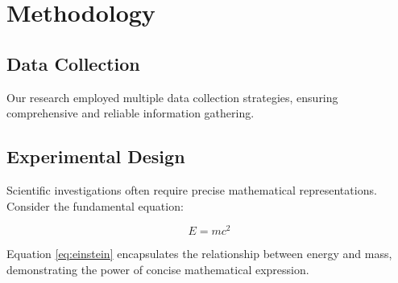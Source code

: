 \section{Methodology}
\subsection{Data Collection}
Our research employed multiple data collection strategies, ensuring comprehensive and reliable information gathering.

\subsection{Experimental Design}
Scientific investigations often require precise mathematical representations. Consider the fundamental equation:

\begin{equation}
E = mc^2 \label{eq:einstein}
\end{equation}

Equation \ref{eq:einstein} encapsulates the relationship between energy and mass, demonstrating the power of concise mathematical expression.